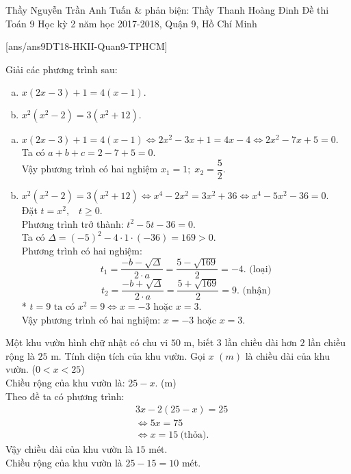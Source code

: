	\begin{name}
		{Thầy Nguyễn Trần Anh Tuấn \& phản biện: Thầy Thanh Hoàng Đinh}
		{Đề thi Toán 9 Học kỳ 2 năm học 2017-2018, Quận 9, Hồ Chí Minh }
	\end{name}
	\setcounter{ex}{0}
	[ans/ans9DT18-HKII-Quan9-TPHCM]
	\begin{ex}%
		Giải các phương trình sau:
		\begin{multicols}{2}
			\begin{enumerate}[a)]
				\item $x(2x-3)+1=4(x-1).$\vfill
				\item $x^2(x^2-2)=3(x^2+12).$
			\end{enumerate}
		\end{multicols}
		\loigiai
		{
			\begin{enumerate}[a)]
				\item $x(2x-3)+1=4(x-1) \Leftrightarrow 2x^2-3x+1=4x-4 \Leftrightarrow 2x^2-7x+5=0.$\\
				Ta có $a+b+c=2-7+5=0.$\\
				Vậy phương trình có hai nghiệm $x_1=1;\;x_2=\dfrac{5}{2}.$
				\item $x^2(x^2-2)=3(x^2+12) \Leftrightarrow x^4-2x^2=3x^2+36 \Leftrightarrow x^4-5x^2-36=0$.\\
				Đặt $t=x^2,\;\;\;t\ge0.$\\
				Phương trình trở thành: $t^2-5t-36=0.$\\
				Ta có $\Delta=(-5)^2-4\cdot1\cdot(-36)=169>0.$\\
				Phương trình có hai nghiệm:
				$$t_1=\dfrac{-b-\sqrt{\Delta}}{2\cdot a}=\dfrac{5-\sqrt{169}}{2}=-4.\text{ (loại)}$$
				$$t_2=\dfrac{-b+\sqrt{\Delta}}{2\cdot a}=\dfrac{5+\sqrt{169}}{2}=9.\text{ (nhận)}$$
				* $t=9 \text{  ta có } x^2=9\Leftrightarrow x=-3 \text{ hoặc }x=3.$\\
				Vậy phương trình có hai nghiệm: $x=-3 \text{ hoặc }x=3.$					 
			\end{enumerate}
		}
	\end{ex}
		\begin{ex}%
		Một khu vườn hình chữ nhật có chu vi $50$ m, biết $3$ lần chiều dài hơn $2$ lần chiều rộng là $25$ m. Tính diện tích của khu vườn.		
		\loigiai
		{
			Gọi $x$ $(m)$ là chiều dài của khu vườn. ($0<x<25$)\\
			Chiều rộng của khu vườn là: $25-x.$  (m)\\
			Theo đề ta có phương trình: 
			\begin{align*}
			&3x-2(25-x)=25\\
			&\Leftrightarrow  5x=75\\
			&\Leftrightarrow  x = 15~\text {(thỏa).}
			\end{align*}
			Vậy chiều dài của khu vườn là $15$ mét.\\
			Chiều rộng của khu vườn là $25-15=10$ mét.
		}
	\end{ex}

